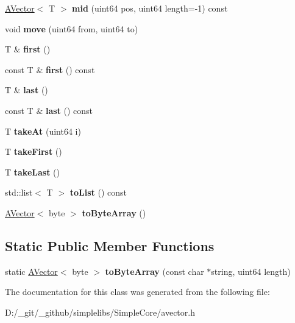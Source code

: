\begin{DoxyCompactItemize}
\mbox{\hyperlink{class_a_vector}{A\+Vector}}$<$ T $>$ {\bfseries mid} (uint64 pos, uint64 length=-\/1) const
\item 
\mbox{\label{class_a_vector_af045120312bc7a66ab31684bdbb039bd}} 
void {\bfseries move} (uint64 from, uint64 to)
\item 
\mbox{\label{class_a_vector_a9ad79c8f2af06e68a9eb022cae0bb966}} 
T \& {\bfseries first} ()
\item 
\mbox{\label{class_a_vector_a960abfbaf4b7b395286c82d79571147a}} 
const T \& {\bfseries first} () const
\item 
\mbox{\label{class_a_vector_a0465c474ee53f57eb8817a531ac530b2}} 
T \& {\bfseries last} ()
\item 
\mbox{\label{class_a_vector_afbdc200be19695bebbbc54dce5693f98}} 
const T \& {\bfseries last} () const
\item 
\mbox{\label{class_a_vector_a37df3ccd66a7747579aee01025e0e440}} 
T {\bfseries take\+At} (uint64 i)
\item 
\mbox{\label{class_a_vector_ae2cad9bb2968e2fe2c96554f6b36c4a9}} 
T {\bfseries take\+First} ()
\item 
\mbox{\label{class_a_vector_abaa54e33aa13edba5b2e4cad679f5c1b}} 
T {\bfseries take\+Last} ()
\item 
\mbox{\label{class_a_vector_a2563a5dbe02466a864d33af52c327198}} 
std\+::list$<$ T $>$ {\bfseries to\+List} () const
\item 
\mbox{\label{class_a_vector_a9bdf3d416f6ccdca02dda755def54433}} 
\mbox{\hyperlink{class_a_vector}{A\+Vector}}$<$ byte $>$ {\bfseries to\+Byte\+Array} ()
\end{DoxyCompactItemize}
\subsection*{Static Public Member Functions}
\begin{DoxyCompactItemize}
\item 
\mbox{\label{class_a_vector_aed5359eafaf528299407c675f064f0db}} 
static \mbox{\hyperlink{class_a_vector}{A\+Vector}}$<$ byte $>$ {\bfseries to\+Byte\+Array} (const char $\ast$string, uint64 length)
\end{DoxyCompactItemize}


The documentation for this class was generated from the following file\+:\begin{DoxyCompactItemize}
\item 
D\+:/\+\_\+git/\+\_\+github/simplelibs/\+Simple\+Core/avector.\+h\end{DoxyCompactItemize}
